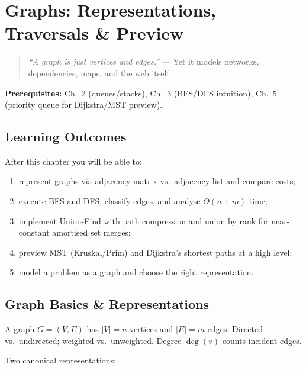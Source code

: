 \chapter{Graphs: Representations, Traversals \& Preview}
\label{ch:graphs}

\begin{quote}
\emph{``A graph is just vertices and edges.''} --- Yet it models networks, dependencies, maps, and the web itself.
\end{quote}

\noindent\textbf{Prerequisites:} Ch.~2 (queues/stacks), Ch.~3 (BFS/DFS intuition), Ch.~5 (priority queue for Dijkstra/MST preview).

\section*{Learning Outcomes}
After this chapter you will be able to:
\begin{enumerate}[label=(L\arabic*)]
    \item represent graphs via adjacency matrix vs.\ adjacency list and compare costs;
    \item execute BFS and DFS, classify edges, and analyse $O(n+m)$ time;
    \item implement Union-Find with path compression and union by rank for near-constant amortised set merges;
    \item preview MST (Kruskal/Prim) and Dijkstra's shortest paths at a high level;
    \item model a problem as a graph and choose the right representation.
\end{enumerate}

\section{Graph Basics \& Representations}
\label{sec:graph-representations}
A graph $G=(V,E)$ has $|V|=n$ vertices and $|E|=m$ edges. Directed vs.\ undirected; weighted vs.\ unweighted. Degree $\deg(v)$ counts incident edges.

Two canonical representations:

